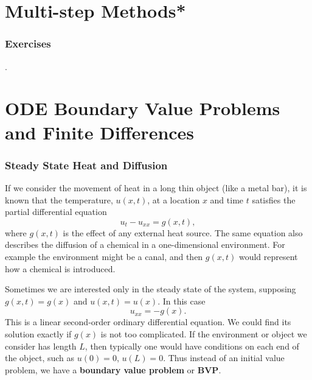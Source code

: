 
\chapter{Multi-step Methods*}


\subsection*{Exercises}
\begin{list}
{.}{}

\item

\end{list}



\chapter{ODE Boundary Value Problems and Finite Differences}


\subsection*{Steady State Heat and Diffusion}

If we consider the movement of heat in a long thin object (like a metal bar),
it is known that the temperature, $u(x,t)$, at a location $x$
and  time $t$ satisfies the partial differential equation
\begin{equation}\label{heat}
u_t - u_{xx} = g(x,t),
\end{equation}
where $g(x,t)$ is the effect of any external heat source.
The same equation also describes the diffusion of a chemical
in a one-dimensional environment. For example the environment
might be a canal, and then $g(x,t)$ would represent
how a chemical is introduced.

Sometimes we are interested only in the steady
state of the system, supposing $g(x,t) = g(x)$ and $u(x,t) = u(x)$.
In this case
$$
     u_{xx} = -g(x).
$$
This is a linear second-order ordinary differential equation.
We could find its solution exactly if $g(x)$ is not too
complicated. If the environment or object we consider has length
$L$, then typically one would have conditions on each end of
the object, such as $u(0) = 0$, $u(L) = 0$. Thus instead of
an initial value problem, we have a {\bf boundary value problem} or {\bf BVP}.

